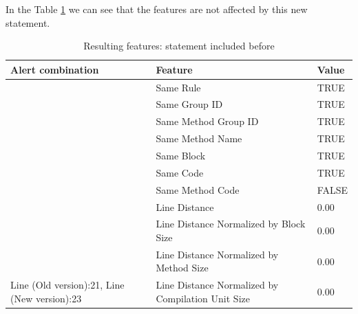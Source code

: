 \documentclass[
]{article}
\begin{document}
\newpage

In the Table \ref{include_statement_before} we can see that the features
are not affected by this new statement.

\small

\begin{table}[!h]

\caption{\label{tab:unnamed-chunk-16}Resulting features: statement included before \label{include_statement_before} }
\centering
\begin{tabular}[t]{l|l|l}
\hline
Alert combination & Feature & Value\\
\hline
\rowcolor{gray!6}   & Same Rule & TRUE\\

 & Same Group ID & TRUE\\

\rowcolor{gray!6}   & Same Method Group ID & TRUE\\

 & Same Method Name & TRUE\\

\rowcolor{gray!6}   & Same Block & TRUE\\

 & Same Code & TRUE\\

\rowcolor{gray!6}   & Same Method Code & FALSE\\

 & Line Distance & 0.00\\

\rowcolor{gray!6}   & Line Distance Normalized by Block Size & 0.00\\

 & Line Distance Normalized by Method Size & 0.00\\

\multirow[t]{-11}{*}{\raggedright\arraybackslash Line (Old version):21, Line (New version):23} & Line Distance Normalized by Compilation Unit Size & 0.00\\
\hline
\end{tabular}
\end{table}

\normalsize

\newpage
\end{document}

